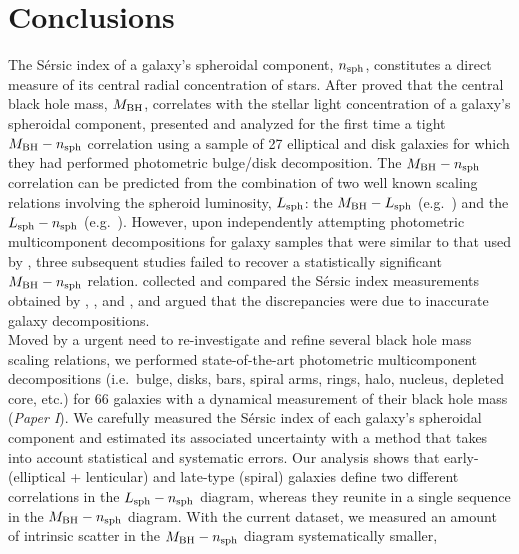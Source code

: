 \documentclass[preprint2]{emulateapj}
\begin{document}
\section{Conclusions} 
The S\'ersic index of a galaxy's spheroidal component, $n_{\rm sph}$, constitutes a direct measure 
of its central radial concentration of stars. 
After \cite{graham2001bulges} proved that the central black hole mass, $M_{\rm BH}$, 
correlates with the stellar light concentration of a galaxy's spheroidal component, 
\cite{grahamdriver2007} presented and analyzed for the first time a tight $M_{\rm BH} - n_{\rm sph}$ correlation 
using a sample of 27 elliptical and disk galaxies for which they had performed photometric bulge/disk decomposition. 
The $M_{\rm BH} - n_{\rm sph}$ correlation can be predicted from the combination of two well known scaling relations 
involving the spheroid luminosity, $L_{\rm sph}$: 
the $M_{\rm BH} - L_{\rm sph}$ (e.g.~\citealt{kormendyrichstone1995,magorrian1998,marconihunt2003,haringrix2004}) 
and the $L_{\rm sph} - n_{\rm sph}$ (e.g.~\citealt{youngcurrie1994,jerjen2000,grahamguzman2003}). 
However, upon independently attempting photometric multicomponent decompositions 
for galaxy samples that were similar to that used by \cite{grahamdriver2007}, 
three subsequent studies \citep{sani2011,vika2012,beifiori2012} failed to recover a statistically significant $M_{\rm BH} - n_{\rm sph}$ relation. 
\cite{savorgnan2013} collected and compared the S\'ersic index measurements obtained by \cite{grahamdriver2007}, 
\cite{sani2011}, \cite{vika2012} and \cite{beifiori2012}, 
and argued that the discrepancies were due to inaccurate galaxy decompositions. \\
Moved by a urgent need to re-investigate and refine several black hole mass scaling relations, 
we performed state-of-the-art photometric multicomponent decompositions 
(i.e.~bulge, disks, bars, spiral arms, rings, halo, nucleus, depleted core, etc.) 
for 66 galaxies with a dynamical measurement of their black hole mass (\emph{Paper I}). 
We carefully measured the S\'ersic index of each galaxy's spheroidal component 
and estimated its associated uncertainty with a method that takes into account statistical and systematic errors. 
Our analysis shows that early- (elliptical + lenticular) and late-type (spiral) galaxies define two different correlations 
in the $L_{\rm sph} - n_{\rm sph}$ diagram, 
whereas they reunite in a single sequence in the $M_{\rm BH} - n_{\rm sph}$ diagram. 
With the current dataset, we measured an amount of intrinsic scatter in the $M_{\rm BH} - n_{\rm sph}$ diagram systematically smaller, 
\end{document}
